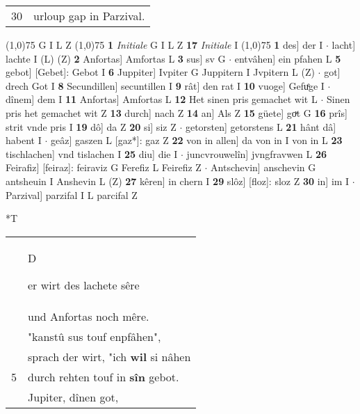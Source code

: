 \documentclass[8pt,a4paper,notitlepage]{article}
\begin{document}
\begin{table}[ht]
\begin{minipage}[t]{0.5\linewidth}
\begin{tabular}{rl}
30 & urloup gap in Parzival.\\ 
\end{tabular}
\scriptsize
\line(1,0){75} \newline
G I L Z \newline
\line(1,0){75} \newline
\textbf{1} \textit{Initiale} G I L Z  \textbf{17} \textit{Initiale} I  \newline
\line(1,0){75} \newline
\textbf{1} des] der I  $\cdot$ lacht] lachte I (L) (Z) \textbf{2} Anfortas] Amfortas L \textbf{3} sus] sv G  $\cdot$ entvâhen] ein pfahen L \textbf{5} gebot] [Gebet]: Gebot I \textbf{6} Juppiter] Ivpiter G Juppitern I Jvpitern L (Z)  $\cdot$ got] drech Got I \textbf{8} Secundillen] secuntillen I \textbf{9} rât] den rat I \textbf{10} vuoge] Gefuͤge I  $\cdot$ dînem] dem I \textbf{11} Anfortas] Amfortas L \textbf{12} Het sinen pris gemachet wit L  $\cdot$ Sinen pris het gemachet wit Z \textbf{13} durch] nach Z \textbf{14} an] Als Z \textbf{15} güete] goͮt G \textbf{16} prîs] strit vnde pris I \textbf{19} dô] da Z \textbf{20} si] siz Z  $\cdot$ getorsten] getorstens L \textbf{21} hânt dâ] habent I  $\cdot$ geâz] gaszen L [gaz*]: gaz Z \textbf{22} von in allen] da von in I von in L \textbf{23} tischlachen] vnd tislachen I \textbf{25} diu] die I  $\cdot$ juncvrouwelîn] jvngfravwen L \textbf{26} Feirafiz] [feiraz]: feiraviz G Ferefiz L Feirefiz Z  $\cdot$ Antschevin] anschevin G antsheuin I Anshevin L (Z) \textbf{27} kêren] in chern I \textbf{29} slôz] [floz]: sloz Z \textbf{30} in] im I  $\cdot$ Parzival] parzifal I L parcifal Z \newline
\end{minipage}
\hspace{0.5cm}
\begin{minipage}[t]{0.5\linewidth}
\small
\begin{center}*T
\end{center}
\begin{tabular}{rl}
 & \begin{large}D\end{large}er wirt des lachete sêre\\ 
 & und Anfortas noch mêre.\\ 
 & "kanstû sus touf enpfâhen",\\ 
 & sprach der wirt, "ich \textbf{wil} si nâhen\\ 
5 & durch rehten touf in \textbf{sîn} gebot.\\ 
 & Jupiter, dînen got,\\ 

\end{tabular}
\end{minipage}
\end{table}
\end{document}
